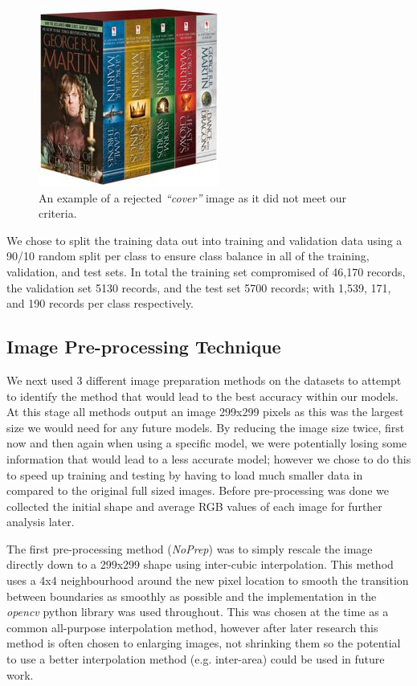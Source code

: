 \documentclass[12pt]{article}
\numberwithin{equation}{section}
\numberwithin{figure}{section}
\begin{document}
\begin{figure}
	\centering
	\captionsetup{justification=centering}
	\includegraphics[scale=0.5]{0345535529.jpg}
	\caption{An example of a rejected \emph{``cover''} image as it did not meet our criteria.}
	\label{fig:bad_cover}
\end{figure}

We chose to split the training data out into training and validation data using a 90/10 random split per class to ensure class balance in all of the training, validation, and test sets. In total the training set compromised of 46,170 records, the validation set 5130 records, and the test set 5700 records; with 1,539, 171, and 190 records per class respectively. 

\subsection{Image Pre-processing Technique} 
\label{sub:Image_Pre-processing_Technique} 

We next used 3 different image preparation methods on the datasets to attempt to identify the method that would lead to the best accuracy within our models. At this stage all methods output an image 299x299 pixels as this was the largest size we would need for any future models. By reducing the image size twice, first now and then again when using a specific model, we were potentially losing some information that would lead to a less accurate model; however we chose to do this to speed up training and testing by having to load much smaller data in compared to the original full sized images. Before pre-processing was done we collected the initial shape and average RGB values of each image for further analysis later.

The first pre-processing method (\emph{NoPrep}) was to simply rescale the image directly down to a 299x299 shape using inter-cubic interpolation. This method uses a 4x4 neighbourhood around the new pixel location to smooth the transition between boundaries as smoothly as possible and the implementation in the \emph{opencv} python library was used throughout. This was chosen at the time as a common all-purpose interpolation method, however after later research this method is often chosen to enlarging images, not shrinking them so the potential to use a better interpolation method (e.g. inter-area) could be used in future work.
\end{document}

